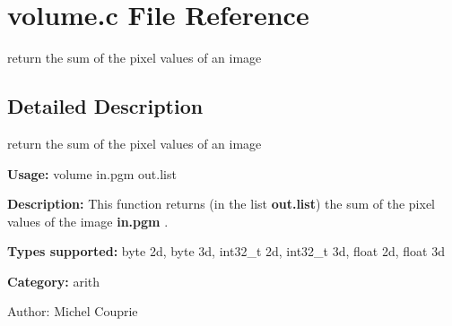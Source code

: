 \section{volume.c File Reference}
\label{volume_8c}
return the sum of the pixel values of an image 



\subsection{Detailed Description}
return the sum of the pixel values of an image 

{\bf Usage:} volume in.pgm out.list

{\bf Description:} This function returns (in the list {\bf out.list}) the sum of the pixel values of the image {\bf in.pgm} .

{\bf Types supported:} byte 2d, byte 3d, int32\_\-t 2d, int32\_\-t 3d, float 2d, float 3d

{\bf Category:} arith

\begin{Desc}
\item[Author:]Michel Couprie \end{Desc}
